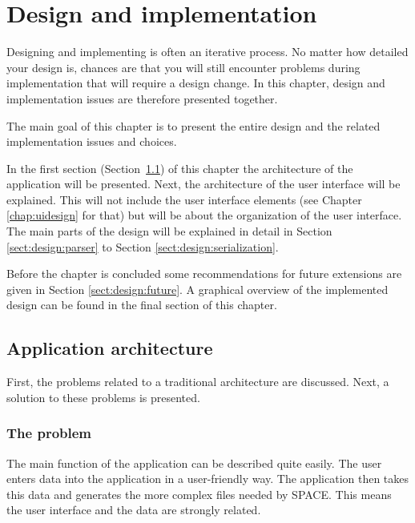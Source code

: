 
\chapter{Design and implementation}
\label{chap:design}

Designing and implementing is often an iterative process. No matter how
detailed your design is, chances are that you will still encounter problems
during implementation that will require a design change. In this chapter,
design and implementation issues are therefore presented together.

\bigskip \noindent
The main goal of this chapter is to present the entire design and the related
implementation issues and choices.

\bigskip \noindent
In the first section (\mbox{Section \ref{sect:design:architecture}}) of this
chapter the architecture of the application will be presented. Next, the
architecture of the user interface will be explained. This will not include the
user interface elements (see Chapter \ref{chap:uidesign} for that) but will be
about the organization of the user interface. The main parts of the design will
be explained in detail in Section \ref{sect:design:parser} to Section
\ref{sect:design:serialization}.

Before the chapter is concluded some recommendations for future extensions are
given in Section \ref{sect:design:future}. A graphical overview of the
implemented design can be found in the final section of this chapter.

\section{Application architecture} \label{sect:design:architecture}
First, the problems related to a traditional architecture are discussed. Next,
a solution to these problems is presented.

\subsection{The problem} \label{sect:design:problem}
The main function of the application can be described quite easily. The user
enters data into the application in a user-friendly way. The application then
takes this data and generates the more complex files needed by SPACE. This
means the user interface and the data are strongly related.

